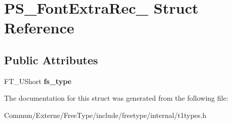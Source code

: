 \hypertarget{struct_p_s___font_extra_rec__}{}\section{P\+S\+\_\+\+Font\+Extra\+Rec\+\_\+ Struct Reference}
\label{struct_p_s___font_extra_rec__}
\subsection*{Public Attributes}
\begin{DoxyCompactItemize}
\item 
F\+T\+\_\+\+U\+Short {\bfseries fs\+\_\+type}\hypertarget{struct_p_s___font_extra_rec___a048e1e57ee974c3e05e9a88476e6b8a9}{}\label{struct_p_s___font_extra_rec___a048e1e57ee974c3e05e9a88476e6b8a9}

\end{DoxyCompactItemize}


The documentation for this struct was generated from the following file\+:\begin{DoxyCompactItemize}
\item 
Commun/\+Externe/\+Free\+Type/include/freetype/internal/t1types.\+h\end{DoxyCompactItemize}
